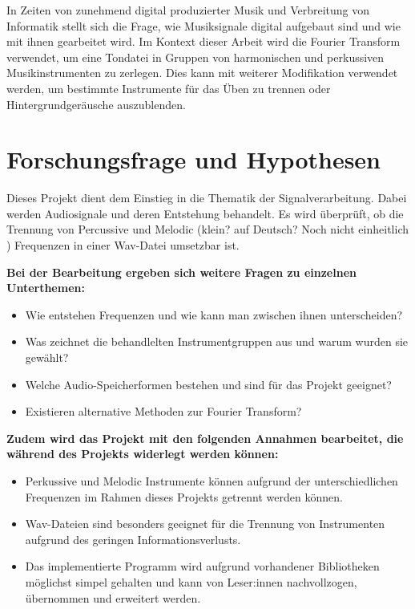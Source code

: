 \par

In Zeiten von zunehmend digital produzierter Musik und Verbreitung von Informatik stellt sich die Frage, wie Musiksignale digital aufgebaut sind und wie mit ihnen gearbeitet wird.
Im Kontext dieser Arbeit wird die Fourier Transform verwendet, um eine Tondatei in Gruppen von harmonischen und perkussiven Musikinstrumenten zu zerlegen.
Dies kann mit weiterer Modifikation verwendet werden, um bestimmte Instrumente für das Üben zu trennen oder Hintergrundgeräusche auszublenden.


%
\section{Forschungsfrage und Hypothesen}
\label{research-question-and-hypotheses}
%

Dieses Projekt dient dem Einstieg in die Thematik der Signalverarbeitung. Dabei werden Audiosignale und deren Entstehung behandelt.
Es wird überprüft, ob die Trennung von Percussive und Melodic (klein? auf Deutsch? Noch nicht einheitlich ) Frequenzen in einer Wav-Datei umsetzbar ist.

\par

\textbf{Bei der Bearbeitung ergeben sich weitere Fragen zu einzelnen Unterthemen:}

%
\begin{itemize}
    \item Wie entstehen Frequenzen und wie kann man zwischen ihnen unterscheiden?
    \item Was zeichnet die behandlelten Instrumentgruppen aus und warum wurden sie gewählt?
    \item Welche Audio-Speicherformen bestehen und sind für das Projekt geeignet?
    \item Existieren alternative Methoden zur Fourier Transform? 
\end{itemize}
%

\textbf{Zudem wird das Projekt mit den folgenden Annahmen bearbeitet, die während des Projekts widerlegt werden können:}

%
\begin{itemize}
    \item Perkussive und Melodic Instrumente können aufgrund der unterschiedlichen Frequenzen im Rahmen dieses Projekts getrennt werden können.
    \item Wav-Dateien sind besonders geeignet für die Trennung von Instrumenten aufgrund des geringen Informationsverlusts.
    \item Das implementierte Programm wird aufgrund vorhandener Bibliotheken möglichst simpel gehalten und kann von Leser:innen nachvollzogen, übernommen und erweitert werden.
\end{itemize}
%

